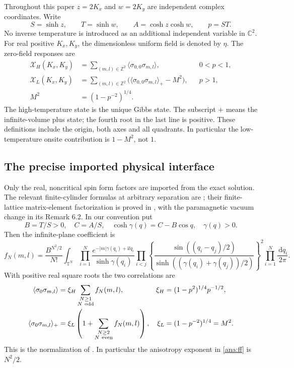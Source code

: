 \documentclass[11pt]{article}
\numberwithin{equation}{section}
\theoremstyle{definition}
\newcommand{\C}{\mathbb C}
\newcommand{\Z}{\mathbb Z}
\newcommand{\T}{\mathbb T}
\newcommand{\ii}{\mathrm i}
\newcommand{\dd}{\,\mathrm d}
\newcommand{\XH}{\mathcal X_H}
\newcommand{\XL}{\mathcal X_L}
\begin{document}
Throughout this paper \(z=2K_x\) and \(w=2K_y\) are independent
complex coordinates. Write
\[
 S=\sinh z,\qquad T=\sinh w,\qquad
 A=\cosh z\cosh w,\qquad p=ST.
\]
No inverse temperature is introduced as an additional independent
variable in \(\C^2\). For real positive \(K_x,K_y\), the
dimensionless uniform field is denoted by \(\eta\). The zero-field
responses are
\begin{align}
 \XH(K_x,K_y)
 &=\sum_{(m,l)\in\Z^2}\langle\sigma_{0,0}\sigma_{m,l}\rangle,
 &&0<p<1, \label{ana:physicalHT}\\
 \XL(K_x,K_y)
 &=\sum_{(m,l)\in\Z^2}
   \bigl(\langle\sigma_{0,0}\sigma_{m,l}\rangle_+-M^2\bigr),
 &&p>1, \label{ana:physicalLT}\\
 M^2&=(1-p^{-2})^{1/4}. \nonumber
\end{align}
The high-temperature state is the unique Gibbs state. The subscript
\(+\) means the infinite-volume plus state; the fourth root in the last
line is positive. These definitions include the origin, both axes and
all quadrants. In particular the low-temperature onsite contribution
is \(1-M^2\), not \(1\).

\subsection{The precise imported physical interface}
\label{ana:interface}

Only the real, noncritical spin form factors are imported from the
exact solution. The relevant finite-cylinder formulas at arbitrary
separation are \cite[(35)--(39)]{BL}; their finite-lattice matrix-element
factorization is proved in \cite[Theorem 6.1]{IL}, with the
paramagnetic vacuum change in its Remark 6.2. In our convention put
\[
 B=T/S>0,\quad C=A/S,\quad
 \cosh\gamma(q)=C-B\cos q,\quad \gamma(q)>0.
\]
Then the infinite-plane coefficient is
\begin{equation}\label{ana:ff}
 f_N(m,l)=\frac{B^{N^2/2}}{N!}
 \int_{\T^N}\prod_{i=1}^N
 \frac{e^{-|m|\gamma(q_i)+\ii lq_i}}{\sinh\gamma(q_i)}
 \prod_{i<j}
 \left\{\frac{\sin((q_i-q_j)/2)}
 {\sinh((\gamma(q_i)+\gamma(q_j))/2)}\right\}^{\!2}
 \prod_{i=1}^N\frac{\dd q_i}{2\pi}.
\end{equation}
With positive real square roots the two correlations are
\begin{align}
 \langle\sigma_0\sigma_{m,l}\rangle
 &=\xi_H\sum_{\substack{N\ge1\\N\ {\rm odd}}}f_N(m,l),
 &\xi_H&=(1-p^2)^{1/4}p^{-1/2},\label{ana:corHT}\\
 \langle\sigma_0\sigma_{m,l}\rangle_+
 &=\xi_L\left(1+\sum_{\substack{N\ge2\\N\ {\rm even}}}f_N(m,l)\right),
 &\xi_L&=(1-p^{-2})^{1/4}=M^2.\label{ana:corLT}
\end{align}
This is the normalization of \cite[(1.8)--(1.10)]{ONGP}.
In particular the anisotropy exponent in \eqref{ana:ff} is \(N^2/2\).
\end{document}

